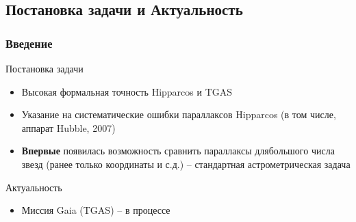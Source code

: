 \documentclass[12pt,aspectratio=43]{beamer}
\begin{document}
 			 
 			 


\subsection{Постановка задачи и Актуальность}

\label{sub:smthgaia}
\begin{frame}\frametitle{Введение}
\begin{block}{Постановка задачи}
\begin{itemize}
  \item Высокая формальная точность Hipparcos и TGAS
  \item Указание на систематические ошибки параллаксов Hipparcos (в том числе, аппарат Hubble, 2007)
  \item \textbf{Впервые} появилась возможность сравнить параллаксы длябольшого числа звезд (ранее только координаты и с.д.) – стандартная астрометрическая задача
  \end{itemize}
\end{block}
\begin{block}{Актуальность}
\begin{itemize}
  \item[] Миссия Gaia (TGAS) – в процессе
\end{itemize}
\end{block}
\end{frame}
\end{document}
